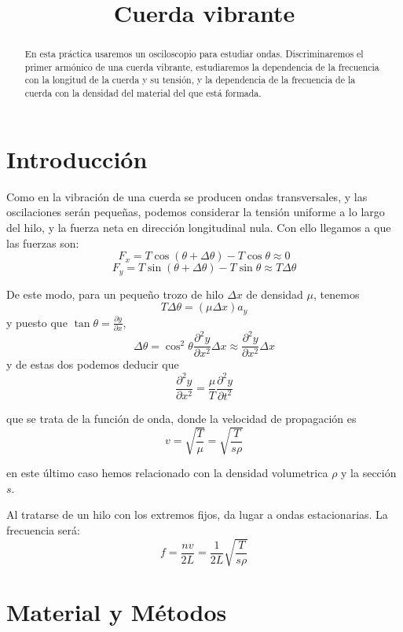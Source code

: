 \documentclass[a4paper,12pt,spanish]{article}
\begin{document}
\title{Cuerda vibrante}

\date{}

\maketitle



\begin{abstract} %
	
En esta práctica usaremos un osciloscopio para estudiar ondas. 
Discriminaremos el primer armónico de una cuerda vibrante, estudiaremos la dependencia de la frecuencia con la longitud de la cuerda y su tensión, y la dependencia de la frecuencia de la cuerda con la densidad del material del que está formada.

	
\end{abstract}

\section{Introducción}

Como en la vibración de una cuerda se producen ondas transversales, y las oscilaciones serán pequeñas, podemos considerar la tensión uniforme a lo largo del hilo, y la fuerza neta en dirección longitudinal nula. Con ello llegamos a que las fuerzas son:
\[F_x = T \cos(\theta + \Delta \theta) - T \cos \theta \approx 0\]
\[F_y = T \sin(\theta + \Delta \theta) - T \sin\theta \approx T\Delta\theta\]

De este modo, para un pequeño trozo de hilo $\Delta x$ de densidad $\mu$, tenemos
\[T\Delta \theta = (\mu \Delta x)a_y
\]
y puesto que $\tan\theta = \frac{\partial y}{\partial x}$,
\[\Delta \theta = \cos^2\theta \frac{\partial^2y}{\partial x^2} \Delta x \approx \frac{\partial^2 y }{\partial x^2}\Delta x\]
y de estas dos podemos deducir que 
\[\frac{\partial^2 y}{\partial x^2}= \frac{\mu}{T}\frac{\partial^2y}{\partial t^2}\]

que se trata de la función de onda, donde la velocidad de propagación es 
\[ v= \sqrt{\frac{T}{\mu}} = \sqrt{\frac{T}{s \rho}} \]

en este último caso hemos relacionado con la densidad volumetrica $\rho$ y la sección $s$. 

Al tratarse de un hilo con los extremos fijos, da lugar a ondas estacionarias. La frecuencia será:
\[f = \frac{nv}{2L} = \frac{1}{2L}\sqrt{\frac{T}{s\rho}}\]


\section{Material y Métodos}
\end{document}

